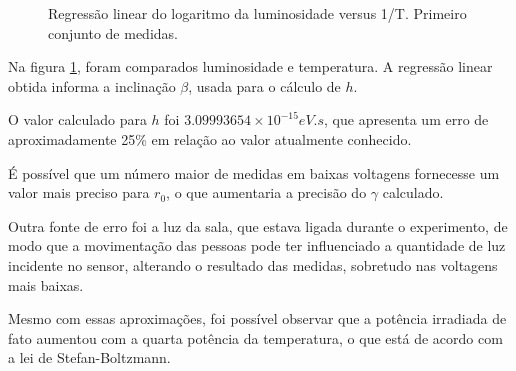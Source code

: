 \documentclass[brazilian,12pt,a4paper,final]{article}
\begin{document}
\begin{figure}[htbp!]
  \caption{Regressão linear do logaritmo da luminosidade versus 1/T. Primeiro conjunto de medidas.}
  \label{fighum}
  \centering
\end{figure}

Na figura \ref{fighum}, foram comparados luminosidade e temperatura. A regressão linear obtida informa a inclinação $\beta$, usada para o cálculo de $h$.

O valor calculado para $h$ foi $3.09993654 \times 10^{-15} eV.s$, que apresenta
um erro de aproximadamente 25\% em relação ao valor atualmente conhecido.

É possível que um número maior de medidas em baixas voltagens fornecesse
um valor mais preciso para $r_0$, o que aumentaria a precisão do $\gamma$
calculado.

Outra fonte de erro foi a luz da sala, que estava ligada durante o 
experimento, de modo que a movimentação das pessoas pode ter influenciado
a quantidade de luz incidente no sensor, 
alterando o resultado das medidas, sobretudo nas voltagens mais baixas.

Mesmo com essas aproximações, 
foi possível observar que a potência irradiada de fato aumentou
com a quarta potência da temperatura, 
o que está de acordo com a lei de Stefan-Boltzmann.
\end{document}

